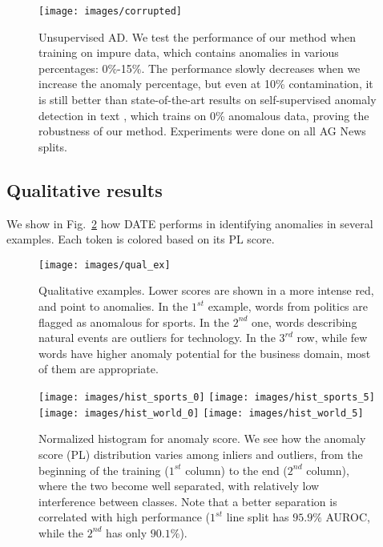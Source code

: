 \documentclass[11pt]{article}
\begin{document}
\begin{figure}[t!]
\centering
\texttt{[image: images/corrupted]}
\caption{Unsupervised AD. We test the performance of our method when training on impure data, which contains anomalies in various percentages: 0\%-15\%. The performance slowly decreases when we increase the anomaly percentage, but even at 10\% contamination, it is still better than state-of-the-art results on self-supervised anomaly detection in text \cite{acl2019}, which trains on 0\% anomalous data, proving the robustness of our method. Experiments were done on all AG News splits.}
\label{fig: fully_unsup_od}
\end{figure}

\subsection{Qualitative results}
We show in Fig.~\ref{fig: qual_ex} how DATE performs in identifying anomalies in several examples. Each token is colored based on its PL score.

\begin{figure}[t!]
\centering
\texttt{[image: images/qual\_ex]} 
\caption{Qualitative examples. Lower scores are shown in a more intense red, and point to anomalies. In the $1^{st}$ example, words from politics are flagged as anomalous for sports. In the $2^{nd}$ one, words describing natural events are outliers for technology. In the $3^{rd}$ row, while few words have higher anomaly potential for the business domain, most of them are appropriate.}
\label{fig: qual_ex}
\end{figure}



\begin{figure}[t!]
\centering
    \texttt{[image: images/hist\_sports\_0]}
    \texttt{[image: images/hist\_sports\_5]} 
    \texttt{[image: images/hist\_world\_0]}
    \texttt{[image: images/hist\_world\_5]}
\caption{Normalized histogram for anomaly score. We see how the anomaly score (PL) distribution varies among inliers and outliers, from the beginning of the training ($1^{st}$ column) to the end ($2^{nd}$ column), where the two become well separated, with relatively low interference between classes. Note that a better separation is correlated with high performance ($1^{st}$ line split has $95.9\%$ AUROC, while the $2^{nd}$ has only $90.1\%$).}
\label{fig: histogram}
\end{figure}
\end{document}
